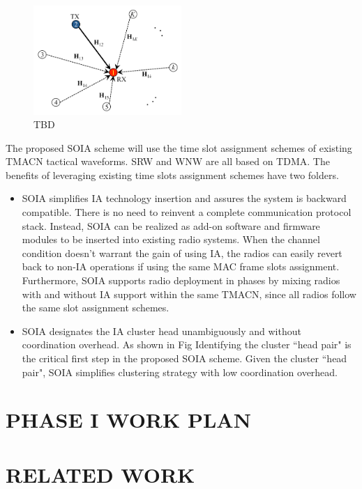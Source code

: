 \documentclass[letterpaper,11pt,onecolumn]{article}
\begin{document}
\begin{figure}[h]
\begin{center}
\includegraphics[width=0.5\textwidth]{../figures/InterferenceAlignment_1.png}
\caption{TBD}
\label{fig:IA_SingleRx}
\end{center}
\end{figure}

The proposed SOIA scheme will use the time slot assignment schemes of existing TMACN tactical waveforms. SRW and WNW are all based on TDMA. The benefits of leveraging existing time slots assignment schemes have two folders. 
\begin{itemize}[noitemsep,nolistsep]
\item SOIA simplifies IA technology insertion and assures the system is backward compatible. There is no need to reinvent a complete communication protocol stack. Instead, SOIA can be realized as add-on software and firmware modules to be inserted into existing radio systems. When the channel condition doesn't warrant the gain of using IA, the radios can easily revert back to non-IA operations if using the same MAC frame slots assignment. Furthermore, SOIA supports radio deployment in phases by mixing radios with and without IA support within the same TMACN, since all radios follow the same slot assignment schemes.
\item SOIA designates the IA cluster head unambiguously and without coordination overhead. As shown in Fig Identifying the cluster ``head pair"  is the critical first step in the proposed SOIA scheme.  Given the cluster ``head pair", SOIA simplifies clustering strategy with low coordination overhead.
\end{itemize}



\section{PHASE I WORK PLAN}

\section{RELATED WORK}
\end{document}
